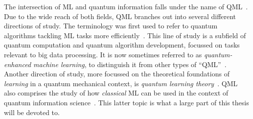 The intersection of \ac{ML} and quantum information falls under the name of \ac{QML}~\cite{wittek2014quantum,schuld2014introduction,adcock2015advances,biamonte2017quantum}.
Due to the wide reach of both fields, \ac{QML} branches out into several different directions of study.
The terminology was first used to refer to quantum algorithms tackling \ac{ML} tasks more efficiently~\cite{giovannetti2008quantum,harrow2009quantum,lloyd2013quantum,lloyd2014quantum,rebentrost2014quantum,lloyd2016quantum,rebentrost2018quantum,rebentrost2016quantum}. This line of study is a subfield of quantum computation and quantum algorithm development, focussed on tasks relevant to big data processing.
It is now sometimes referred to as \emph{quantum-enhanced machine learning}, to distinguish it from other types of ``QML''~\cite{wittek2014quantum,schuld2014introduction,dunjko2017machine,ciliberto2018quantum,schuld2018supervised,perdomo-ortiz2018opportunities}.
Another direction of study, more focussed on the theoretical foundations of \emph{learning} in a quantum mechanical context, is \emph{quantum learning theory}~\cite{aaronson2007learnability,aaronson2017shadow,arunachalam2017survey,aaronson2018online,rocchetto2019experimental}.
QML also comprises the study of how \emph{classical} \ac{ML} can be used in the context of quantum information science~\cite{zdeborov2017machine,spears2018deep,carleo2019machine}.
This latter topic is what a large part of this thesis will be devoted to.

